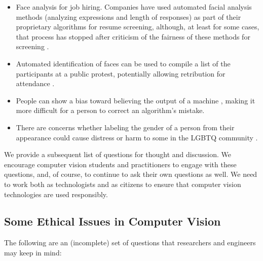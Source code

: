 \begin{itemize}
\item Face analysis for job hiring.  Companies have used automated facial analysis methods (analyzing expressions and length of responses) as part of their proprietary algorithms for resume screening, although, at least for some cases, that process has stopped after criticism of the fairness of these methods for screening \cite{Kahn2021}.
\item Automated identification of faces can be used to compile a list of the participants at a public protest, potentially allowing retribution for attendance
 \cite{Garvie2016,Mozur2019}.
\item People can show a bias toward believing the output of a machine \cite{Cummings2004}, making it more difficult for a person to correct an algorithm's mistake.

\item There are concerns whether labeling the gender of a person from their appearance could cause distress or harm to some in the LGBTQ community \cite{Hamidi2018,Bennett2021}.
\end{itemize}

We provide a subsequent list of
questions for thought and discussion.  We encourage computer vision students and
practitioners to engage with these questions, and, of course, to continue to ask their own questions as well.  We need to work both as technologists and as citizens to ensure that computer vision technologies are used responsibly.


\subsection{Some Ethical Issues in Computer Vision}

The following are an (incomplete) set of questions that researchers and engineers may keep in mind:

